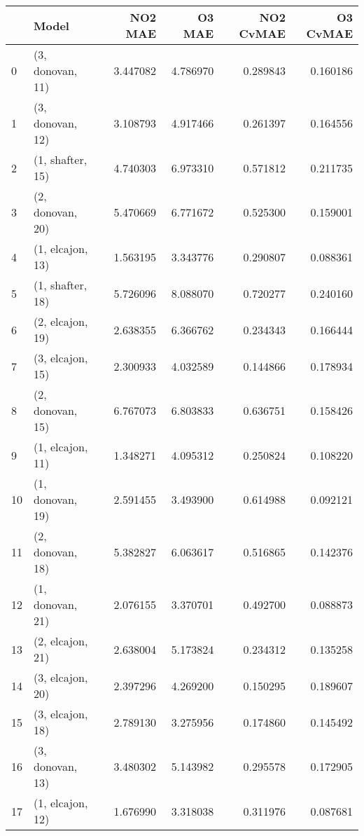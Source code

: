 \begin{tabular}{llrrrr}
\toprule
{} &             Model &   NO2 MAE &    O3 MAE &  NO2 CvMAE &  O3 CvMAE \\
\midrule
0  &  (3, donovan, 11) &  3.447082 &  4.786970 &   0.289843 &  0.160186 \\
1  &  (3, donovan, 12) &  3.108793 &  4.917466 &   0.261397 &  0.164556 \\
2  &  (1, shafter, 15) &  4.740303 &  6.973310 &   0.571812 &  0.211735 \\
3  &  (2, donovan, 20) &  5.470669 &  6.771672 &   0.525300 &  0.159001 \\
4  &  (1, elcajon, 13) &  1.563195 &  3.343776 &   0.290807 &  0.088361 \\
5  &  (1, shafter, 18) &  5.726096 &  8.088070 &   0.720277 &  0.240160 \\
6  &  (2, elcajon, 19) &  2.638355 &  6.366762 &   0.234343 &  0.166444 \\
7  &  (3, elcajon, 15) &  2.300933 &  4.032589 &   0.144866 &  0.178934 \\
8  &  (2, donovan, 15) &  6.767073 &  6.803833 &   0.636751 &  0.158426 \\
9  &  (1, elcajon, 11) &  1.348271 &  4.095312 &   0.250824 &  0.108220 \\
10 &  (1, donovan, 19) &  2.591455 &  3.493900 &   0.614988 &  0.092121 \\
11 &  (2, donovan, 18) &  5.382827 &  6.063617 &   0.516865 &  0.142376 \\
12 &  (1, donovan, 21) &  2.076155 &  3.370701 &   0.492700 &  0.088873 \\
13 &  (2, elcajon, 21) &  2.638004 &  5.173824 &   0.234312 &  0.135258 \\
14 &  (3, elcajon, 20) &  2.397296 &  4.269200 &   0.150295 &  0.189607 \\
15 &  (3, elcajon, 18) &  2.789130 &  3.275956 &   0.174860 &  0.145492 \\
16 &  (3, donovan, 13) &  3.480302 &  5.143982 &   0.295578 &  0.172905 \\
17 &  (1, elcajon, 12) &  1.676990 &  3.318038 &   0.311976 &  0.087681 \\
\bottomrule
\end{tabular}
